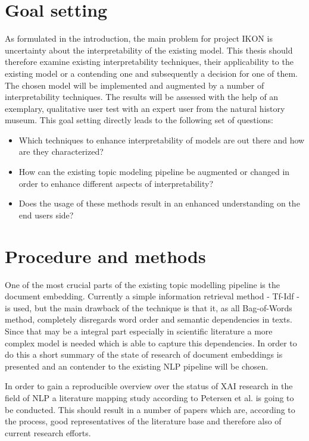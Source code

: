 \documentclass[pdftex,a4paper,12pt]{scrartcl}
\begin{document}
\section{Goal setting} 
As formulated in the introduction, the main problem for project IKON is uncertainty about the interpretability of the existing model. This thesis should therefore examine existing interpretability techniques, their applicability to the existing model or a contending one and subsequently a decision for one of them. The chosen model will be implemented and augmented by a number of interpretability techniques. The results will be assessed with the help of an exemplary, qualitative user test with an expert user from the natural history museum. This goal setting directly leads to the following set of questions:
\begin{itemize}
	\item Which techniques to enhance interpretability of models are out there and how are they characterized?
	\item How can the existing topic modeling pipeline be augmented or changed in order to enhance different aspects of interpretability?
	\item Does the usage of these methods result in an enhanced understanding on the end users side?
\end{itemize}



\section{Procedure and methods}

One of the most crucial parts of the existing topic modelling pipeline is the document embedding. Currently a simple information retrieval method - Tf-Idf - is used, but the main drawback of the technique is that it, as all Bag-of-Words method, completely disregards word order and semantic dependencies in texts. Since that may be a integral part especially in scientific literature a more complex model is needed which is able to capture this dependencies. In order to do this a short summary of the state of research of document embeddings is presented and an contender to the existing NLP pipeline will be chosen. 

In order to gain a reproducible overview over the status of XAI research in the field of NLP a literature mapping study according to Petersen et al. \cite{petersenSystematicMappingStudies2008} is going to be conducted. This should result in a number of papers which are, according to the process, good representatives of the literature base and therefore also of current research efforts. 
\end{document}
